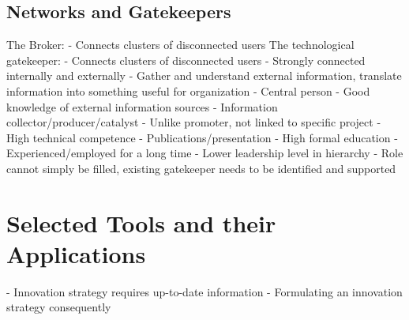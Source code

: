 \documentclass{scrartcl}
\begin{document}
\subsection*{Networks and Gatekeepers}
The Broker:
- Connects clusters of disconnected users
The technological gatekeeper:
- Connects clusters of disconnected users
- Strongly connected internally and externally
- Gather and understand external information, translate information into something useful for organization
- Central person
- Good knowledge of external information sources
- Information collector/producer/catalyst
- Unlike promoter, not linked to specific project
- High technical competence
- Publications/presentation
- High formal education
- Experienced/employed for a long time
- Lower leadership level in hierarchy
- Role cannot simply be filled, existing gatekeeper needs to be identified and supported

\section*{Selected Tools and their Applications}
- Innovation strategy requires up-to-date information
- Formulating an innovation strategy consequently
\end{document}
